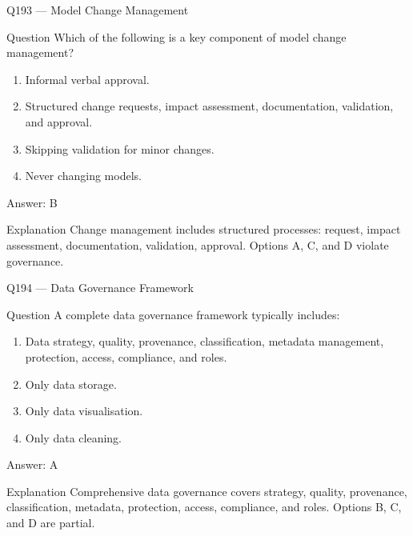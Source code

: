 \documentclass[aspectratio=169,8pt]{beamer}
\begin{document}
	\begin{frame}{Q193 --- Model Change Management}
		\begin{block}{Question}
			Which of the following is a key component of model change management?
			\begin{enumerate}
				\item Informal verbal approval.
				\item Structured change requests, impact assessment, documentation, validation, and approval.
				\item Skipping validation for minor changes.
				\item Never changing models.
			\end{enumerate}  \end{block}
			\begin{exampleblock}{Answer: B}\end{exampleblock}
			\begin{block}{Explanation}
				Change management includes structured processes: request, impact assessment, documentation, validation, approval. Options A, C, and D violate governance.
			\end{block}
		\end{frame}
		
		\begin{frame}{Q194 --- Data Governance Framework}
			\begin{block}{Question}
				A complete data governance framework typically includes:
				\begin{enumerate}
					\item Data strategy, quality, provenance, classification, metadata management, protection, access, compliance, and roles.
					\item Only data storage.
					\item Only data visualisation.
					\item Only data cleaning.
				\end{enumerate}  \end{block}
				\begin{exampleblock}{Answer: A}\end{exampleblock}
				\begin{block}{Explanation}
					Comprehensive data governance covers strategy, quality, provenance, classification, metadata, protection, access, compliance, and roles. Options B, C, and D are partial.
				\end{block}
			\end{frame}
			
\end{document}
